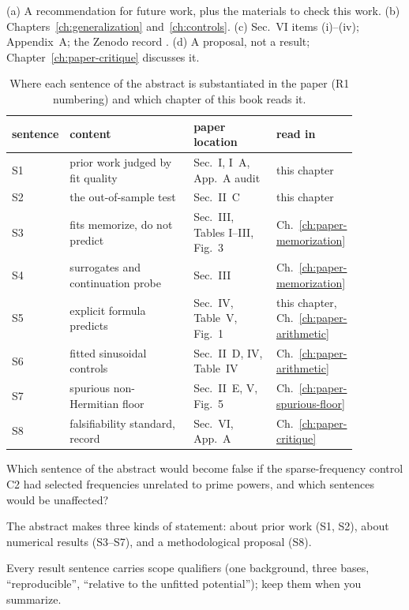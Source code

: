 (a) A recommendation for future work, plus the materials to check this work. (b) Chapters~\ref{ch:generalization} and~\ref{ch:controls}. (c) Sec.~VI items (i)--(iv); Appendix~A; the Zenodo record \cite{zenodo}. (d) A proposal, not a result; Chapter~\ref{ch:paper-critique} discusses it.

\begin{table}[htbp]\centering
\caption{Where each sentence of the abstract is substantiated in the paper (R1 numbering) and which chapter of this book reads it.}\label{tab:paper-setup-abstract}
\small
\begin{tabular}{p{0.07\linewidth}p{0.36\linewidth}p{0.24\linewidth}p{0.2\linewidth}}
\toprule
sentence & content & paper location & read in \\
\midrule
S1 & prior work judged by fit quality & Sec.~I, I~A, App.~A audit & this chapter \\
S2 & the out-of-sample test & Sec.~II~C & this chapter \\
S3 & fits memorize, do not predict & Sec.~III, Tables I--III, Fig.~3 & Ch.~\ref{ch:paper-memorization} \\
S4 & surrogates and continuation probe & Sec.~III & Ch.~\ref{ch:paper-memorization} \\
S5 & explicit formula predicts & Sec.~IV, Table~V, Fig.~1 & this chapter, Ch.~\ref{ch:paper-arithmetic} \\
S6 & fitted sinusoidal controls & Sec.~II~D, IV, Table~IV & Ch.~\ref{ch:paper-arithmetic} \\
S7 & spurious non-Hermitian floor & Sec.~II~E, V, Fig.~5 & Ch.~\ref{ch:paper-spurious-floor} \\
S8 & falsifiability standard, record & Sec.~VI, App.~A & Ch.~\ref{ch:paper-critique} \\
\bottomrule
\end{tabular}
\end{table}

\begin{checkpoint}
Which sentence of the abstract would become false if the sparse-frequency control C2 had selected frequencies unrelated to prime powers, and which sentences would be unaffected?
\end{checkpoint}

\begin{keyideas}
\item The abstract makes three kinds of statement: about prior work (S1, S2), about numerical results (S3--S7), and a methodological proposal (S8).
\item Every result sentence carries scope qualifiers (one background, three bases, ``reproducible'', ``relative to the unfitted potential''); keep them when you summarize.
\end{keyideas}

